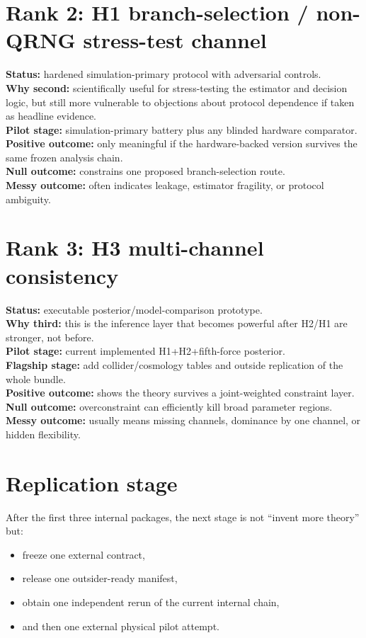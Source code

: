 \documentclass[reprint,amsmath,amssymb,aps,showkeys]{revtex4-2}
\begin{document}
\section*{Rank 2: H1 branch-selection / non-QRNG stress-test channel}
\textbf{Status:} hardened simulation-primary protocol with adversarial controls.\\
\textbf{Why second:} scientifically useful for stress-testing the estimator and decision logic, but still more vulnerable to objections about protocol dependence if taken as headline evidence.\\
\textbf{Pilot stage:} simulation-primary battery plus any blinded hardware comparator.\\
\textbf{Positive outcome:} only meaningful if the hardware-backed version survives the same frozen analysis chain.\\
\textbf{Null outcome:} constrains one proposed branch-selection route.\\
\textbf{Messy outcome:} often indicates leakage, estimator fragility, or protocol ambiguity.

\section*{Rank 3: H3 multi-channel consistency}
\textbf{Status:} executable posterior/model-comparison prototype.\\
\textbf{Why third:} this is the inference layer that becomes powerful after H2/H1 are stronger, not before.\\
\textbf{Pilot stage:} current implemented H1+H2+fifth-force posterior.\\
\textbf{Flagship stage:} add collider/cosmology tables and outside replication of the whole bundle.\\
\textbf{Positive outcome:} shows the theory survives a joint-weighted constraint layer.\\
\textbf{Null outcome:} overconstraint can efficiently kill broad parameter regions.\\
\textbf{Messy outcome:} usually means missing channels, dominance by one channel, or hidden flexibility.

\section*{Replication stage}
After the first three internal packages, the next stage is not ``invent more theory'' but:
\begin{itemize}
    \item freeze one external contract,
    \item release one outsider-ready manifest,
    \item obtain one independent rerun of the current internal chain,
    \item and then one external physical pilot attempt.
\end{itemize}
\end{document}
